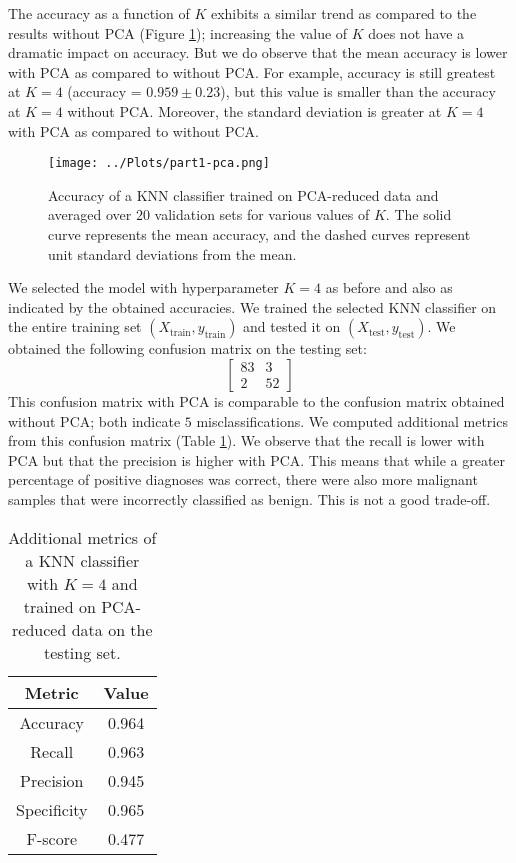\documentclass[12pt]{article}
\newcommand{\Xtrain}{X_{\mbox{train}}}
\newcommand{\ytrain}{y_{\mbox{train}}}
\newcommand{\Xtest}{X_{\mbox{test}}}
\newcommand{\ytest}{y_{\mbox{test}}}
\begin{document}
The accuracy as a function of $K$ exhibits a similar trend as compared to the results without PCA (Figure \ref{part1-pca}); increasing the value of $K$ does not have a dramatic impact on accuracy. But we do observe that the mean accuracy is lower with PCA as compared to without PCA. For example, accuracy is still greatest at $K=4$ (accuracy = $0.959\pm 0.23$), but this value is smaller than the accuracy at $K=4$ without PCA. Moreover, the standard deviation is greater at $K=4$ with PCA as compared to without PCA.

\begin{figure}
\centering
\texttt{[image: ../Plots/part1-pca.png]}
\caption{\label{part1-pca} Accuracy of a KNN classifier trained on PCA-reduced data and averaged over $20$ validation sets for various values of $K$. The solid curve represents the mean accuracy, and the dashed curves represent unit standard deviations from the mean.}
\end{figure}

We selected the model with hyperparameter $K=4$ as before and also as indicated by the obtained accuracies. We trained the selected KNN classifier on the entire training set $(\Xtrain, \ytrain)$ and tested it on $(\Xtest, \ytest)$. We obtained the following confusion matrix on the testing set:
\[ \begin{bmatrix}
83 & 3 \\
2 & 52
\end{bmatrix} \]
This confusion matrix with PCA is comparable to the confusion matrix obtained without PCA; both indicate $5$ misclassifications. We computed additional metrics from this confusion matrix (Table \ref{part1-pca-table}). We observe that the recall is lower with PCA but that the precision is higher with PCA. This means that while a greater percentage of positive diagnoses was correct, there were also more malignant samples that were incorrectly classified as benign. This is not a good trade-off.

\begin{table}
\begin{tabular}{|c|c|} \hline
Metric & Value \\ \hline
Accuracy & 0.964 \\
Recall & 0.963 \\
Precision & 0.945 \\
Specificity & 0.965 \\
F-score & 0.477 \\ \hline
\end{tabular}
\caption{\label{part1-pca-table} Additional metrics of a KNN classifier with $K=4$ and trained on PCA-reduced data on the testing set.}
\end{table}
\end{document}
